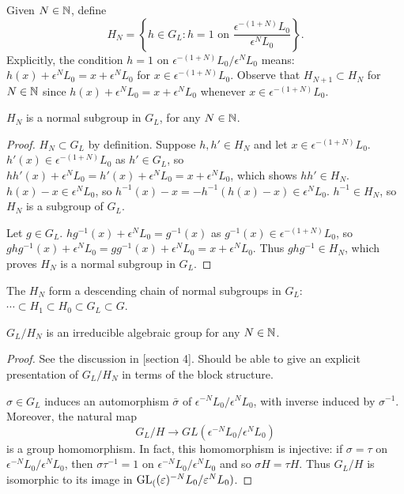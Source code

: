 \documentclass[a4paper, 11pt]{report}
\begin{document}
Given $N\in\mathbb{N}$, define
\begin{equation*}
H_N = \left\{ h\in G_L: h=1 \text{ on } \frac{\epsilon^{-(1+N)}L_0}{\epsilon^N L_0} \right\}.
\end{equation*}
Explicitly, the condition $h=1$ on $\epsilon^{-(1+N)}L_0/{\epsilon^N L_0}$ means: $h(x) + \epsilon^N L_0 = x + \epsilon^N L_0$ for $x\in\epsilon^{-(1+N)}L_0$. Observe that $H_{N+1}\subset H_N$ for $N\in\mathbb{N}$ since $h(x) + \epsilon^N L_0 = x + \epsilon^N L_0$ whenever $x\in\epsilon^{-(1+N)}L_0$.

\begin{lemma}
$H_N$ is a normal subgroup in $G_L$, for any $N\in\mathbb{N}$.
\end{lemma}

\begin{proof}
$H_N\subset G_L$ by definition. Suppose $h,h'\in H_N$ and let $x\in\epsilon^{-(1+N)}L_0$. $h'(x)\in\epsilon^{-(1+N)}L_0$ as $h'\in G_L$, so $hh'(x) + \epsilon^N L_0 = h'(x) + \epsilon^N L_0 = x + \epsilon^N L_0$, which shows $hh'\in H_N$. $h(x)-x\in\epsilon^N L_0$, so $h^{-1}(x) - x = -h^{-1}(h(x)-x)\in\epsilon^N L_0$. $h^{-1}\in H_N$, so $H_N$ is a subgroup of $G_L$.

Let $g\in G_L$. $hg^{-1}(x) + \epsilon^N L_0 = g^{-1}(x)$ as $g^{-1}(x)\in\epsilon^{-(1+N)}L_0$, so $ghg^{-1}(x) + \epsilon^N L_0 = gg^{-1}(x) + \epsilon^N L_0 = x + \epsilon^N L_0$. Thus $ghg^{-1}\in H_N$, which proves $H_N$ is a normal subgroup in $G_L$.
\end{proof}

The $H_N$ form a descending chain of normal subgroups in $G_L$: $\cdots\subset H_1 \subset H_0 \subset G_L \subset G$.

\begin{lemma}\label{lemma:algebraic-quotient-group}
$G_L/H_N$ is an irreducible algebraic group for any $N\in\mathbb{N}$.
\end{lemma}

{\color{blue}
\begin{proof}
See the discussion in \cite{lusztig99}[section 4]. Should be able to give an explicit presentation of $G_L/H_N$ in terms of the block structure.

$\sigma\in G_L$ induces an automorphism $\bar{\sigma}$ of $\epsilon^{-N} L_0/{\epsilon^N L_0}$, with inverse induced by $\sigma^{-1}$. Moreover, the natural map
\begin{equation*}
G_L/H \to GL(\epsilon^{-N}L_0/{\epsilon^N L_0})
\end{equation*}
is a group homomorphism. In fact, this homomorphism is injective: if $\sigma = \tau$ on $\epsilon^{-N}L_0/{\epsilon^N L_0}$, then $\sigma\tau^{-1} = 1$ on $\epsilon^{-N}L_0/{\epsilon^N L_0}$ and so $\sigma H = \tau H$. Thus $G_L/H$ is isomorphic to its image in $\operatorname{GL}_{(}(\varepsilon)^{-N}L_0/{\varepsilon^N L_0})$.
\end{proof}
}
\end{document}
